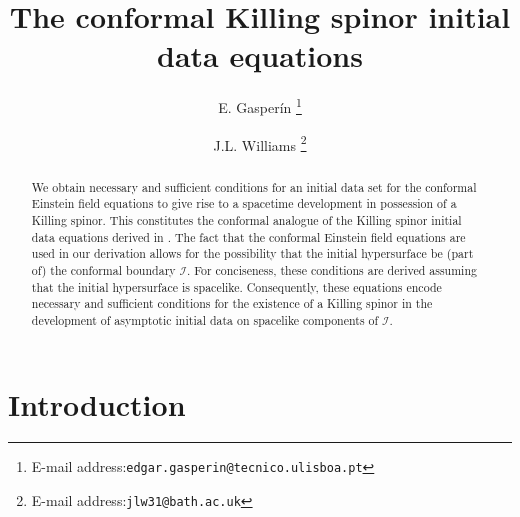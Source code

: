 \documentclass[10pt,a4paper]{article}
\theoremstyle{plain}
\begin{document}
\title{\textbf{The conformal Killing spinor initial data equations}}

\author[1]{E. Gasper\'in \footnote{E-mail address:{\tt edgar.gasperin@tecnico.ulisboa.pt}}}
\author[2]{J.L. Williams \footnote{E-mail address:{\tt jlw31@bath.ac.uk}}}



\maketitle
\begin{abstract}
 We obtain necessary and sufficient conditions for an initial data set for the
 conformal Einstein field equations to give rise to a spacetime
 development in possession of a Killing spinor. This
 constitutes the conformal analogue of the Killing spinor initial data
 equations derived in \cite{GarVal08c}. The fact that the conformal
 Einstein field equations are used in our derivation allows for the 
possibility that the initial hypersurface be (part of) the conformal boundary
 $\mathscr{I}$. For conciseness, these conditions are derived assuming
 that the initial hypersurface is spacelike. Consequently, these
 equations encode necessary and sufficient conditions for the
 existence of a Killing spinor in the development of asymptotic
 initial data on spacelike components of $\mathscr{I}$.
\end{abstract}


\section{Introduction}
\end{document}
